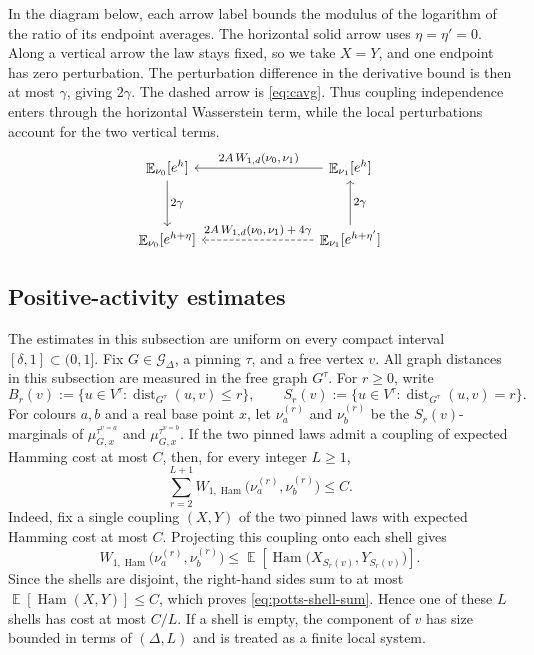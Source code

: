 \documentclass[11pt,reqno]{article}
\theoremstyle{plain}
\theoremstyle{definition}
\theoremstyle{remark}
\theoremstyle{definition}
\theoremstyle{remark}
\newcommand{\dist}{\operatorname{dist}}
\DeclareMathOperator{\E}{\mathbb{E}}
\DeclareMathOperator{\Ham}{Ham}
\newcommand{\Deg}{\Delta}                        %
\newcommand{\Wd}{W_{1,d}}                        %
\newcommand{\WHam}{W_{1,\Ham}}                   %
\newcommand{\Gdeg}{\mathcal{G}_{\Deg}}
\newcommand{\mupin}[3]{\mu_{#1,#3}^{#2}}
\begin{document}
In the diagram below, each arrow label bounds the modulus of the
logarithm of the ratio of its endpoint averages.  The horizontal solid arrow uses
\(\eta=\eta'=0\).  Along a vertical arrow the law stays fixed, so we
take \(X=Y\), and one endpoint has zero perturbation.  The perturbation
difference in the derivative bound is then at most \(\gamma\), giving
\(2\gamma\).
The dashed arrow is \eqref{eq:cavg}.  Thus coupling independence enters
through the horizontal Wasserstein term, while the local perturbations
account for the two vertical terms.
\[
  \begin{tikzcd}[column sep=8em,row sep=3.2em,labels={font=\footnotesize}]
    \E_{\nu_0}[e^h]
      \arrow[d, "{2\gamma}"]
      &
    \E_{\nu_1}[e^h]
      \arrow[l, "{2A\,\Wd(\nu_0,\nu_1)}"']
      \\
    \E_{\nu_0}[e^{h+\eta}]
      &
    \E_{\nu_1}[e^{h+\eta'}]
      \arrow[u, "{2\gamma}"']
      \arrow[l, dashed, "{2A\,\Wd(\nu_0,\nu_1)+4\gamma}"']
  \end{tikzcd}
\]

\subsection{Positive-activity estimates}
\label{sec:potts-induction}

The estimates in this subsection are uniform on every compact interval
\([\delta,1]\subset(0,1]\).
Fix \(G\in\Gdeg\), a pinning \(\tau\), and a free vertex \(v\).  All
graph distances in this subsection are measured in the free graph \(G^\tau\).
For \(r\ge0\), write
\[
  B_r(v):=\{u\in V^\tau:\dist_{G^\tau}(u,v)\le r\},
  \qquad
  S_r(v):=\{u\in V^\tau:\dist_{G^\tau}(u,v)=r\}.
\]
For colours \(a,b\) and a real base point \(x\), let \(\nu_a^{(r)}\) and
\(\nu_b^{(r)}\) be the \(S_r(v)\)-marginals of
\(\mupin{G}{\tau^{v=a}}{x}\) and \(\mupin{G}{\tau^{v=b}}{x}\).  If the
two pinned laws admit a coupling of expected Hamming cost at most \(C\),
then, for every integer \(L\ge1\),
\begin{equation}\label{eq:potts-shell-sum}
  \sum_{r=2}^{L+1}
    \WHam\bigl(\nu_a^{(r)},\nu_b^{(r)}\bigr)
  \le C.
\end{equation}
Indeed, fix a single coupling \((X,Y)\) of the two pinned laws with
expected Hamming cost at most \(C\).  Projecting this coupling onto each
shell gives
\[
  \WHam\bigl(\nu_a^{(r)},\nu_b^{(r)}\bigr)
  \le\E\!\left[\Ham\bigl(X_{S_r(v)},Y_{S_r(v)}\bigr)\right].
\]
Since the shells are disjoint, the right-hand sides sum to at most
\(\E[\Ham(X,Y)]\le C\), which proves \eqref{eq:potts-shell-sum}.
Hence one of these \(L\) shells has cost at most \(C/L\).  If a
shell is empty, the component of \(v\) has size bounded in terms of
\((\Deg,L)\) and is treated as a finite local system.
\end{document}

